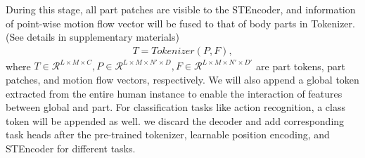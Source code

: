 During this stage, all part patches are visible to the STEncoder, and information of point-wise motion flow vector will be fused to that of body parts in Tokenizer. (See details in supplementary materials)
\begin{equation}
    \begin{aligned}
    T = Tokenizer(P,F),
    \end{aligned}
\end{equation}
where $T \in \mathcal{R}^{L \times M \times C}, P \in \mathcal{R}^{L \times M \times N' \times D}, F \in \mathcal{R}^{L \times M \times N' \times D'}$ are part tokens, part patches, and motion flow vectors, respectively. We will also append a global token extracted from the entire human instance to enable the interaction of features between global and part. For classification tasks like action recognition, a class token will be appended as well.
we discard the decoder and add corresponding task heads after the pre-trained tokenizer, learnable position encoding, and STEncoder for different tasks.
